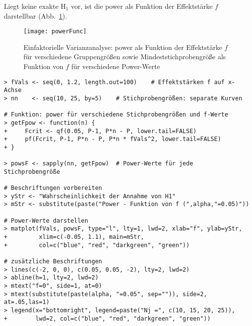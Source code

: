 Liegt keine exakte $\text{H}_{1}$ vor, ist die power als Funktion der Effektstärke $f$ darstellbar (Abb.\ \ref{fig:powerFunc}).

\begin{figure}[ht]
\centering
\texttt{[image: powerFunc]}
\vspace*{-0.5em}
\caption{Einfaktorielle Varianzanalyse: power als Funktion der Effektstärke $f$ für verschiedene Gruppengrößen sowie Mindeststichprobengröße als Funktion von $f$ für verschiedene Power-Werte}
\label{fig:powerFunc}
\end{figure}

\begin{lstlisting}
> fVals <- seq(0, 1.2, length.out=100)    # Effektstärken f auf x-Achse
> nn    <- seq(10, 25, by=5)    # Stichprobengrößen: separate Kurven

# Funktion: power für verschiedene Stichprobengrößen und f-Werte
> getFpow <- function(n) {
+     Fcrit <- qf(0.05, P-1, P*n - P, lower.tail=FALSE)
+     pf(Fcrit, P-1, P*n - P, P*n * fVals^2, lower.tail=FALSE)
+ }

> powsF <- sapply(nn, getFpow)  # Power-Werte für jede Stichprobengröße

# Beschriftungen vorbereiten
> yStr <- "Wahrscheinlichkeit der Annahme von H1"
> mStr <- substitute(paste("Power - Funktion von f (",alpha,"=0.05)"))

# Power-Werte darstellen
> matplot(fVals, powsF, type="l", lty=1, lwd=2, xlab="f", ylab=yStr,
+         xlim=c(-0.05, 1.1), main=mStr,
+         col=c("blue", "red", "darkgreen", "green"))

# zusätzliche Beschriftungen
> lines(c(-2, 0, 0), c(0.05, 0.05, -2), lty=2, lwd=2)
> abline(h=1, lty=2, lwd=2)
> mtext("f=0", side=1, at=0)
> mtext(substitute(paste(alpha, "=0.05", sep="")), side=2, at=.05,las=1)
> legend(x="bottomright", legend=paste("Nj =", c(10, 15, 20, 25)),
+        lwd=2, col=c("blue", "red", "darkgreen", "green"))
\end{lstlisting}

